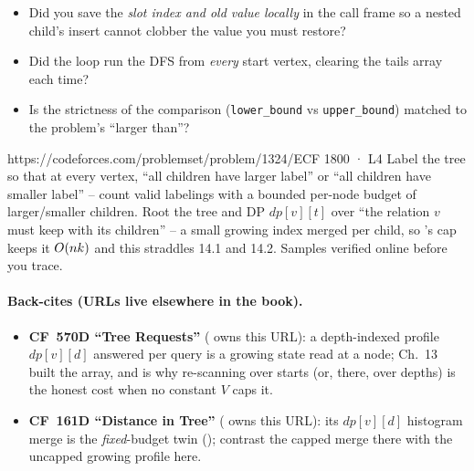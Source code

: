 \begin{stuckbox}
\begin{itemize}[nosep, leftmargin=1.4em]
  \item Did you save the \emph{slot index and old value locally} in the call frame so
        a nested child's insert cannot clobber the value you must restore?
  \item Did the loop run the DFS from \emph{every} start vertex, clearing the tails
        array each time?
  \item Is the strictness of the comparison (\lstinline{lower_bound} vs
        \lstinline{upper_bound}) matched to the problem's ``larger than''?
\end{itemize}
\end{stuckbox}

\begin{practiceset}
    {https://codeforces.com/problemset/problem/1324/E}{CF 1800 · L4}
    {Label the tree so that at every vertex, ``all children have larger label'' or
    ``all children have smaller label'' -- count valid labelings with a bounded
    per-node budget of larger/smaller children. Root the tree and DP
    $\mathit{dp}[v][t]$ over ``the relation $v$ must keep with its children'' -- a
    small growing index merged per child, so 's cap keeps it
    $O(nk)$ and this straddles 14.1 and 14.2. Samples verified online before you
    trace.}
\end{practiceset}

\paragraph{Back-cites (URLs live elsewhere in the book).}
\begin{itemize}[nosep,leftmargin=1.4em]
  \item \textbf{CF~570D ``Tree Requests''} ( owns this URL): a
        depth-indexed profile $\mathit{dp}[v][d]$ answered per query is a growing
        state read at a node; Ch.~13 built the array, and 
        is why re-scanning over starts (or, there, over depths) is the honest cost
        when no constant $V$ caps it.
  \item \textbf{CF~161D ``Distance in Tree''} ( owns this URL): its
        $\mathit{dp}[v][d]$ histogram merge is the \emph{fixed}-budget twin
        (); contrast the capped merge there with the uncapped
        growing profile here.
\end{itemize}

